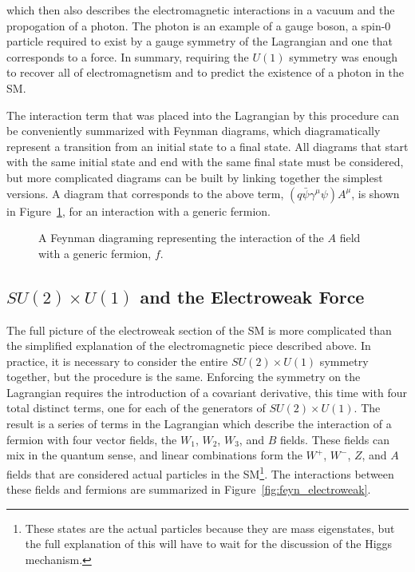 \noindent which then also describes the electromagnetic interactions in a vacuum and the propogation of a photon.
The photon is an example of a gauge boson, a spin-0 particle required to exist by a gauge symmetry of the Lagrangian and one that corresponds to a force.
In summary, requiring the $U(1)$ symmetry was enough to recover all of electromagnetism and to predict the existence of a photon in the \ac{SM}. 

The interaction term that was placed into the Lagrangian by this procedure can be conveniently summarized with Feynman diagrams, which diagramatically represent a transition from an initial state to a final state.
All diagrams that start with the same initial state and end with the same final state must be considered, but more complicated diagrams can be built by linking together the simplest versions.
A diagram that corresponds to the above term, $(q\bar{\psi}\gamma^\mu\psi)A^\mu$, is shown in Figure~\ref{fig:feyn_aff}, for an interaction with a generic fermion.

\begin{figure}
\caption{A Feynman diagraming representing the interaction of the $A$ field with a generic fermion, $f$.} 
\label{fig:feyn_aff}
\end{figure}


\subsection{$SU(2)\times U(1)$ and the Electroweak Force}

The full picture of the electroweak section of the \ac{SM} is more complicated than the simplified explanation of the electromagnetic piece described above. 
In practice, it is necessary to consider the entire $SU(2)\times U(1)$ symmetry together, but the procedure is the same.
Enforcing the symmetry on the Lagrangian requires the introduction of a covariant derivative, this time with four total distinct terms, one for each of the generators of $SU(2)\times U(1)$.
The result is a series of terms in the Lagrangian which describe the interaction of a fermion with four vector fields, the $W_1$, $W_2$, $W_3$, and $B$ fields.
These fields can mix in the quantum sense, and linear combinations form the $W^+$, $W^-$, $Z$, and $A$ fields that are considered actual particles in the \ac{SM}\footnote{These states are the actual particles because they are mass eigenstates, but the full explanation of this will have to wait for the discussion of the Higgs mechanism.}.
The interactions between these fields and fermions are summarized in Figure~\ref{fig:feyn_electroweak}.

